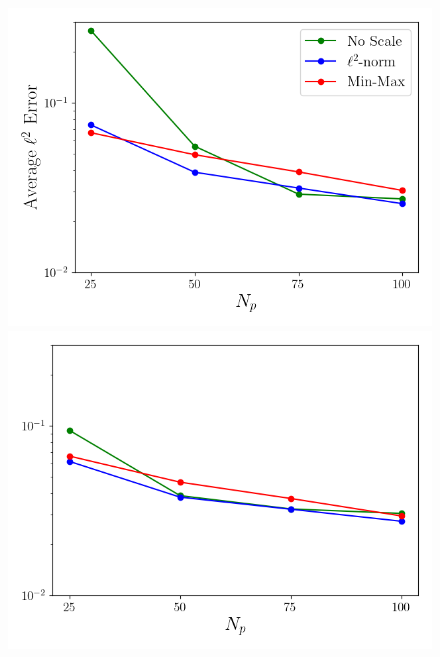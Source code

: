 \begin{figure}
	\begin{minipage}{0.32\linewidth}
		\includegraphics[width=0.99\linewidth]{Chapters/BestPractices/Images/errVsModes_centScale_centNone_Average_errorRaw.png}
	\end{minipage}
	\begin{minipage}{0.32\linewidth}
		\includegraphics[width=0.99\linewidth]{Chapters/BestPractices/Images/errVsModes_centScale_centIC_Average_errorRaw.png}
	\end{minipage}
	\begin{minipage}{0.32\linewidth}

\end{minipage}
\end{figure}
